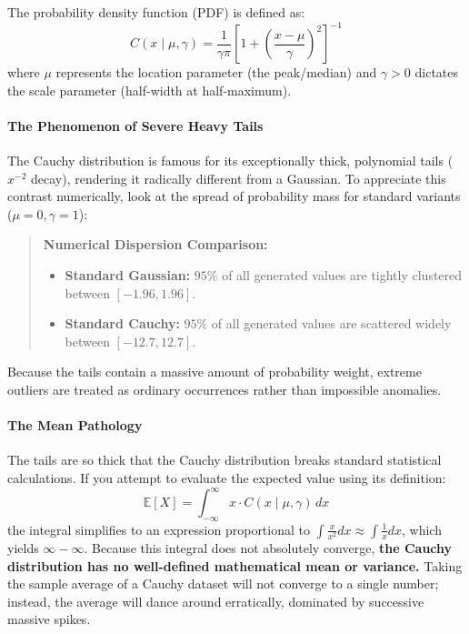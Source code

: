 \documentclass{article}
\begin{document}
The probability density function (PDF) is defined as:
\begin{equation}
C(x \mid \mu, \gamma) = \frac{1}{\gamma \pi} \left[ 1 + \left( \frac{x - \mu}{\gamma} \right)^2 \right]^{-1} \tag{194}
\end{equation}
where $\mu$ represents the location parameter (the peak/median) and $\gamma > 0$ dictates the scale parameter (half-width at half-maximum).

\paragraph{The Phenomenon of Severe Heavy Tails}
The Cauchy distribution is famous for its exceptionally thick, polynomial tails ($x^{-2}$ decay), rendering it radically different from a Gaussian. To appreciate this contrast numerically, look at the spread of probability mass for standard variants ($\mu=0, \gamma=1$):

\begin{quote}
\textbf{Numerical Dispersion Comparison:}
\begin{itemize}
    \item \textbf{Standard Gaussian:} $95\%$ of all generated values are tightly clustered between $[-1.96, 1.96]$.
    \item \textbf{Standard Cauchy:} $95\%$ of all generated values are scattered widely between $[-12.7, 12.7]$.
\end{itemize}
\end{quote}

Because the tails contain a massive amount of probability weight, extreme outliers are treated as ordinary occurrences rather than impossible anomalies. 

\paragraph{The Mean Pathology}
The tails are so thick that the Cauchy distribution breaks standard statistical calculations. If you attempt to evaluate the expected value using its definition:
\begin{equation*}
\mathbb{E}[X] = \int_{-\infty}^{\infty} x \cdot C(x \mid \mu, \gamma) \, dx
\end{equation*}
the integral simplifies to an expression proportional to $\int \frac{x}{x^2} dx \approx \int \frac{1}{x} dx$, which yields $\infty - \infty$. Because this integral does not absolutely converge, \textbf{the Cauchy distribution has no well-defined mathematical mean or variance.} Taking the sample average of a Cauchy dataset will not converge to a single number; instead, the average will dance around erratically, dominated by successive massive spikes.
\end{document}
